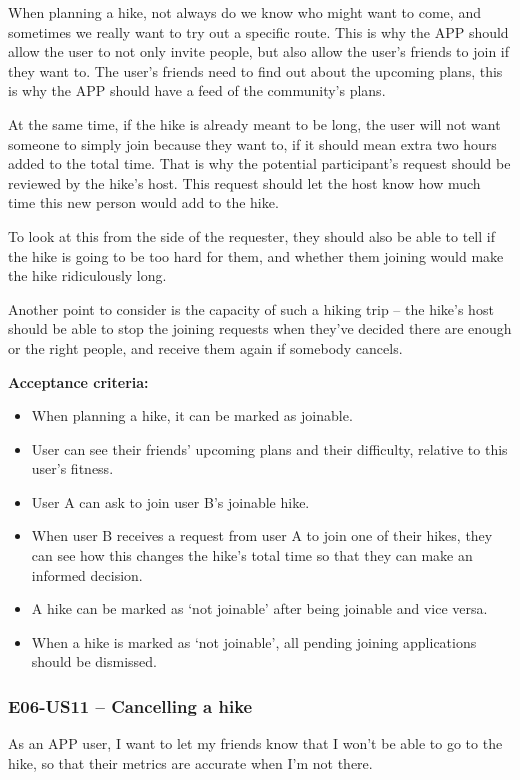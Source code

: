 When planning a hike, not always do we know who might want to come, and sometimes we really want to try out a specific route.
This is why the APP should allow the user to not only invite people, but also allow the user's friends to join if they want to.
The user's friends need to find out about the upcoming plans, this is why the APP should have a feed of the community's plans.

At the same time, if the hike is already meant to be long, the user will not want someone to simply join because they want to, if it should mean extra two hours added to the total time.
That is why the potential participant's request should be reviewed by the hike's host.
This request should let the host know how much time this new person would add to the hike.

To look at this from the side of the requester, they should also be able to tell if the hike is going to be too hard for them, and whether them joining would make the hike ridiculously long.

Another point to consider is the capacity of such a hiking trip -- the hike's host should be able to stop the joining requests when they've decided there are enough or the right people, and receive them again if somebody cancels.

\textbf{Acceptance criteria:}
\begin{itemize}
    \item When planning a hike, it can be marked as joinable.
    \item User can see their friends' upcoming plans and their difficulty, relative to this user's fitness.
    \item User A can ask to join user B's joinable hike.
    \item When user B receives a request from user A to join one of their hikes, they can see how this changes the hike's total time so that they can make an informed decision.
    \item A hike can be marked as `not joinable' after being joinable and vice versa.
    \item When a hike is marked as `not joinable', all pending joining applications should be dismissed.
\end{itemize}

\subsubsection*{E06-US11 -- Cancelling a hike}
As an APP user, I want to let my friends know that I won't be able to go to the hike, so that their metrics are accurate when I'm not there.

